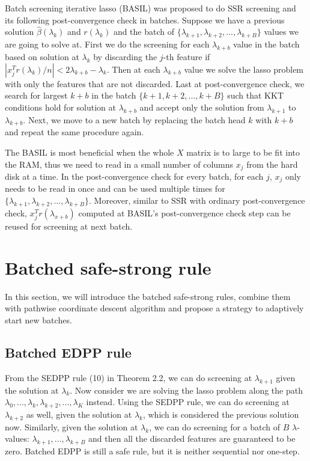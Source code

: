 \documentclass{article}
\begin{document}
Batch screening iterative lasso (BASIL) \cite{qian2019fast} was proposed to do SSR screening and its following post-convergence check in batches. Suppose we have a previous solution $\hat{\beta}(\lambda_k)$ and $r(\lambda_k)$ and the batch of $\{\lambda_{k+1},\lambda_{k+2},...,\lambda_{k+B}\}$ values we are going to solve at. First we do the screening for each $\lambda_{k+b}$ value in the batch based on solution at $\lambda_k$ by discarding the $j$-th feature if $|x_j^Tr(\lambda_k)/n|<2\lambda_{k+b}-\lambda_k$. Then at each $\lambda_{k+b}$ value we solve the lasso problem with only the features that are not discarded. Last at post-convergence check, we search for largest $k+b$ in the batch $\{k+1,k+2,...,k+B\}$ such that KKT conditions hold for solution at $\lambda_{k+b}$ and accept only the solution from $\lambda_{k+1}$ to $\lambda_{k+b}$. Next, we move to a new batch by replacing the batch head $k$ with $k+b$ and repeat the same procedure again.

The BASIL is most beneficial when the whole $X$ matrix is to large to be fit into the RAM, thus we need to read in a small number of columns $x_j$ from the hard disk at a time. In the post-convergence check for every batch, for each $j$, $x_j$ only needs to be read in once and can be used multiple times for $\{\lambda_{k+1},\lambda_{k+2},...,\lambda_{k+B}\}$. Moreover, similar to SSR with ordinary post-convergence check, $x_j^Tr(\lambda_{x+b})$ computed at BASIL's post-convergence check step can be reused for screening at next batch.




\section{Batched safe-strong rule}
\label{sec:method}

In this section, we will introduce the batched safe-strong rules, combine them with pathwise coordinate descent algorithm and propose a strategy to adaptively  start new batches.

\subsection{Batched EDPP rule}

From the SEDPP rule (10) in Theorem 2.2, we can do screening at $\lambda_{k+1}$ given the solution at $\lambda_k$. Now consider we are solving the lasso problem along the path $\lambda_0,...,\lambda_k,\lambda_{k+2},...,\lambda_K$ instead. Using the SEDPP rule, we can do screening at $\lambda_{k+2}$ as well, given the solution at $\lambda_k$, which is considered the previous solution now. Similarly, given the solution at $\lambda_k$, we can do screening for a batch of $B$ $\lambda$-values: $\lambda_{k+1},...,\lambda_{k+B}$ and then all the discarded features are guaranteed to be zero. Batched EDPP is still a safe rule, but it is neither sequential nor one-step.
\end{document}
